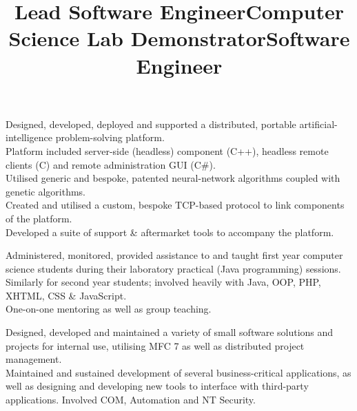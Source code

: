 \documentclass{resume}
\begin{document}
\begin{resume}
\title{\bf Lead Software Engineer}
\begin{position}
Designed, developed, deployed and supported a distributed, portable artificial-intelligence problem-solving platform.\vspace{1mm}\\
Platform included server-side (headless) component (C++), headless remote clients (C) and remote administration GUI (C\#).\vspace{1mm}\\
Utilised generic and bespoke, patented neural-network algorithms coupled with genetic algorithms.\vspace{1mm}\\
Created and utilised a custom, bespoke TCP-based protocol to link components of the platform.\vspace{1mm}\\
Developed a suite of support \& aftermarket tools to accompany the platform.
\end{position}

\title{\bf Computer Science Lab Demonstrator}
\begin{position}
Administered, monitored, provided assistance to and taught first year computer science students during their laboratory practical (Java programming) sessions.\vspace{1mm}\\
Similarly for second year students; involved heavily with Java, OOP, PHP, XHTML, CSS \& JavaScript.\vspace{1mm}\\
One-on-one mentoring as well as group teaching.
\end{position}

\title{\bf Software Engineer}
\begin{position}
Designed, developed and maintained a variety of small software solutions and projects for internal use, utilising MFC 7 as well as distributed project management.\vspace{1mm}\\
Maintained and sustained development of several business-critical applications, as well as designing and developing new tools to interface with third-party applications. Involved COM, Automation and NT Security.
\end{position}


\end{resume}
\end{document}

